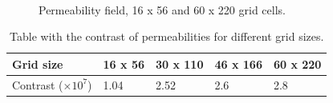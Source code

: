 \documentclass{ecmorXV}
\begin{document}
\begin{figure}[!h]
\centering
{} \
\caption{Permeability field, 16 x 56 and 60 x 220 grid cells.}\label{fig:perm}
\end{figure}

\begin{table}[!ht]
\centering
\begin{tabular}{ |p{2.5cm}|p{1.5cm}|p{1.5cm}|p{1.5cm}|p{1.5cm}|  } 
 \hline
  Grid size & 16 x 56 & 30 x 110 & 46 x 166 & 60 x 220\\
  \hline
  Contrast ($\times10^{7}$) & 1.04 & 2.52&  2.6&  2.8\\ 
\hline
\end{tabular}
\caption{Table with the contrast of permeabilities for
different grid sizes.}
\label{table:permgs}
\end{table}
\end{document}
